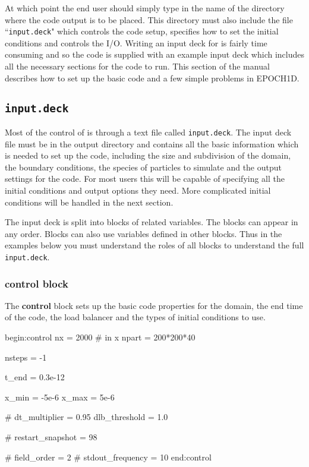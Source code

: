 \documentclass[12pt,a4paper]{article}
\newcommand{\code}[1]{{\texttt{#1}}}
\newcommand{\inlineemph}[1]{{\color{warwicklight} \bf{#1}}}
\newcommand{\cemph}[1]{{\inlineemph{#1}}}
\newcommand{\EPOCH}{{\color{warwickdark}\fontfamily{phv}\selectfont{EPOCH}}}
\newenvironment{lboxverbatim}[1]{
\setlength{\FrameSep}{0pt}
\def\FrameCommand{\fboxsep=0pt \colorbox{shadecolor}}
\MakeFramed{\FrameRestore}
\vspace{-13.5pt}
\fvset{label=#1}
\boxverb
}{
\endboxverb
\vspace{-13.5pt}
\endMakeFramed
}
\newcommand{\qtt}[1]{``{\tt #1}"}
\begin{document}
At which point the end user should simply type in the name of the directory
where the code output is to be placed. This directory must also include the
file \qtt{input.deck} which controls the code setup, specifies how to set the
initial conditions and controls the I/O. Writing an input deck for {\EPOCH} is
fairly time consuming and so the code is supplied with an example input deck
which includes all the necessary sections for the code to run. This section of
the manual describes how to set up the basic code and a few simple problems in
EPOCH1D.

\subsection{\code{input.deck}}
Most of the control of {\EPOCH} is through a text file called \code{input.deck}.
The input deck file must be in the output directory and contains all the basic
information which is needed to set up the code, including the size and
subdivision of the domain, the boundary conditions, the species of particles to
simulate and the output settings for the code. For most users this will be
capable of specifying all the initial conditions and output options they need.
More complicated initial conditions will be handled in the next section.

The input deck is split into blocks of related variables. The blocks can appear
in any order. Blocks can also use variables defined in other blocks. Thus in
the examples below you must understand the roles of all blocks to understand
the full \code{input.deck}.

\subsubsection{\cemph{control} block}
The \cemph{control} block sets up the basic code properties for the
domain, the end time of the code, the load balancer and the types of initial
conditions to use.

\begin{lboxverbatim}{control block}
begin:control
   nx = 2000 # in x
   npart = 200*200*40

   nsteps = -1

   t_end = 0.3e-12

   x_min = -5e-6
   x_max = 5e-6

   # dt_multiplier = 0.95
   dlb_threshold = 1.0

   # restart_snapshot = 98

   # field_order = 2
   # stdout_frequency = 10
end:control
\end{lboxverbatim}
\end{document}
